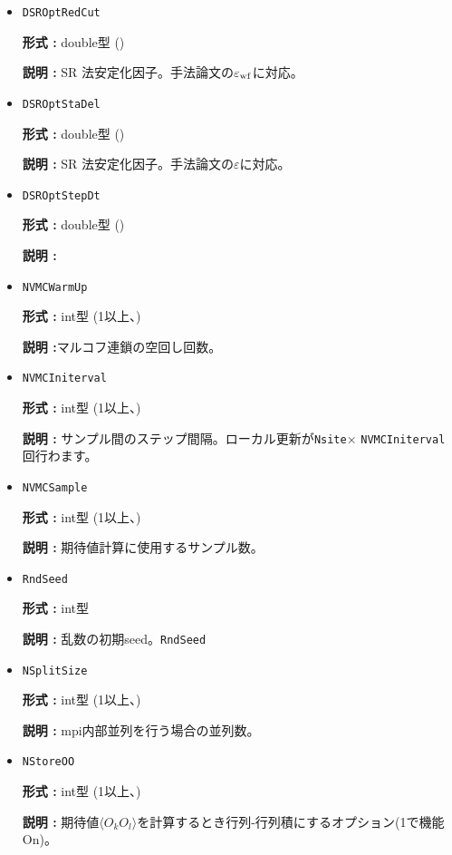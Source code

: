 \begin{itemize}
{\bf 説明 :} \verb|NSROptItrStep|ステップ中、最後の\verb|NSROptItrSmp|ステップでの各変分パラメータの平均値を最適値とする。\verb|NVMCCalMode|=0の場合のみ使用されます。

\item   \verb|DSROptRedCut|
   
{\bf 形式 :} double型 ()

{\bf 説明 :} SR 法安定化因子。手法論文の$\varepsilon_{\rm wf}$に対応。

 \item  \verb|DSROptStaDel| 
   
 {\bf 形式 :} double型 ()

  {\bf 説明 :} SR 法安定化因子。手法論文の$\varepsilon$に対応。
     
\item \verb|DSROptStepDt|

{\bf 形式 :} double型 ()

{\bf 説明 :} 
 
\item \verb|NVMCWarmUp|

{\bf 形式 :} int型 (1以上、)

{\bf 説明 :}マルコフ連鎖の空回し回数。

\item \verb|NVMCIniterval|

{\bf 形式 :} int型 (1以上、)

{\bf 説明 :} サンプル間のステップ間隔。ローカル更新が\verb|Nsite|× \verb|NVMCIniterval| 回行わます。

\item \verb|NVMCSample|

{\bf 形式 :} int型 (1以上、)

{\bf 説明 :} 期待値計算に使用するサンプル数。

\item \verb|RndSeed|

{\bf 形式 :} int型 

{\bf 説明 :} 乱数の初期seed。\verb|RndSeed|

 \item \verb|NSplitSize|

{\bf 形式 :} int型 (1以上、)

{\bf 説明 :} mpi内部並列を行う場合の並列数。

\item \verb|NStoreOO|

{\bf 形式 :} int型 (1以上、)

{\bf 説明 :} 期待値$\langle O_k O_l \rangle$を計算するとき行列-行列積にするオプション(1で機能On)。
 
\end{itemize}


